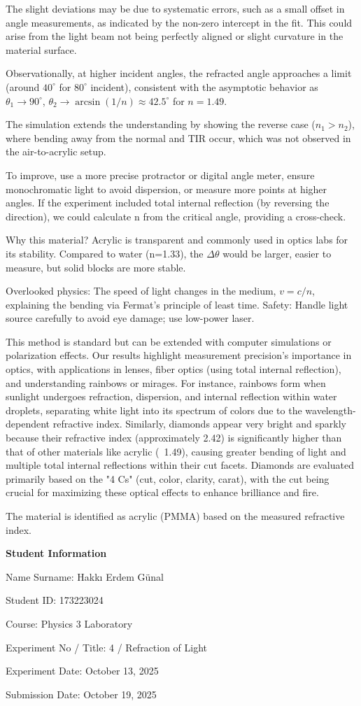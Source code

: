\documentclass[12pt, a4paper]{article}
\begin{document}
The slight deviations may be due to systematic errors, such as a small offset in angle measurements, as indicated by the non-zero intercept in the fit. This could arise from the light beam not being perfectly aligned or slight curvature in the material surface.

Observationally, at higher incident angles, the refracted angle approaches a limit (around $40^\circ$ for $80^\circ$ incident), consistent with the asymptotic behavior as $\theta_1 \to 90^\circ$, $\theta_2 \to \arcsin(1/n) \approx 42.5^\circ$ for $n=1.49$.

The simulation extends the understanding by showing the reverse case ($n_1 > n_2$), where bending away from the normal and TIR occur, which was not observed in the air-to-acrylic setup.

To improve, use a more precise protractor or digital angle meter, ensure monochromatic light to avoid dispersion, or measure more points at higher angles. If the experiment included total internal reflection (by reversing the direction), we could calculate n from the critical angle, providing a cross-check.

Why this material? Acrylic is transparent and commonly used in optics labs for its stability. Compared to water (n=1.33), the $\Delta \theta$ would be larger, easier to measure, but solid blocks are more stable.

Overlooked physics: The speed of light changes in the medium, $v = c/n$, explaining the bending via Fermat's principle of least time. Safety: Handle light source carefully to avoid eye damage; use low-power laser.

This method is standard but can be extended with computer simulations or polarization effects. Our results highlight measurement precision's importance in optics, with applications in lenses, fiber optics (using total internal reflection), and understanding rainbows or mirages. For instance, rainbows form when sunlight undergoes refraction, dispersion, and internal reflection within water droplets, separating white light into its spectrum of colors due to the wavelength-dependent refractive index. Similarly, diamonds appear very bright and sparkly because their refractive index (approximately 2.42) is significantly higher than that of other materials like acrylic (~1.49), causing greater bending of light and multiple total internal reflections within their cut facets. Diamonds are evaluated primarily based on the "4 Cs" (cut, color, clarity, carat), with the cut being crucial for maximizing these optical effects to enhance brilliance and fire.

The material is identified as acrylic (PMMA) based on the measured refractive index.

\newpage

\textbf{Student Information}

Name Surname: Hakkı Erdem Günal

Student ID: 173223024

Course: Physics 3 Laboratory

Experiment No / Title: 4 / Refraction of Light

Experiment Date: October 13, 2025

Submission Date: October 19, 2025
\end{document}
